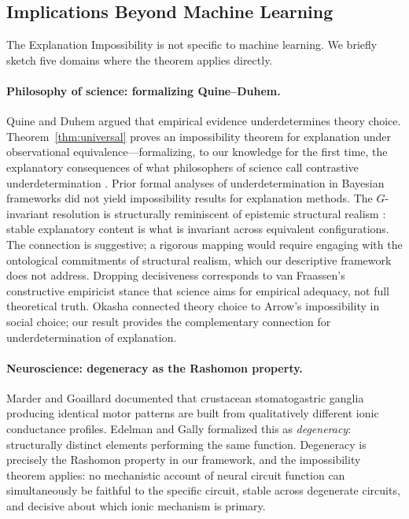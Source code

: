 \documentclass{article}
\begin{document}
\subsection{Implications Beyond Machine Learning}
\label{sec:beyond-ml}

The Explanation Impossibility is not specific to machine learning.
We briefly sketch five domains where the theorem applies directly.

\paragraph{Philosophy of science: formalizing Quine--Duhem.}
Quine \citep{quine1951dogmas} and Duhem \citep{duhem1906aim} argued that
empirical evidence underdetermines theory choice.  Theorem~\ref{thm:universal}
proves an impossibility theorem for explanation under observational
equivalence---formalizing, to our knowledge for the first time, the explanatory
consequences of what philosophers of science call contrastive
underdetermination \citep{laudan1991empirical}. Prior formal analyses of
underdetermination in Bayesian
frameworks \citep{dorling1979bayesian,howson2006scientific} did not yield
impossibility results for explanation methods. The $G$-invariant
resolution is structurally reminiscent of epistemic structural
realism \citep{worrall1989structural}: stable explanatory content is what
is invariant across equivalent configurations. The connection is suggestive;
a rigorous mapping would require engaging with the ontological commitments
of structural realism, which our descriptive framework does not address.
Dropping decisiveness corresponds to van
Fraassen's \citep{vanfraassen1980scientific} constructive empiricist stance
that science aims for empirical adequacy, not full theoretical truth.
Okasha \citep{okasha2011theory} connected theory choice to Arrow's impossibility
in social choice; our result provides the complementary connection for
underdetermination of explanation.

\paragraph{Neuroscience: degeneracy as the Rashomon property.}
Marder and Goaillard \citep{marder2006variability} documented that crustacean
stomatogastric ganglia producing identical motor patterns are built from
qualitatively different ionic conductance profiles.  Edelman and Gally
\citep{edelman2001degeneracy} formalized this as \emph{degeneracy}:
structurally distinct elements performing the same function.  Degeneracy is
precisely the Rashomon property in our framework, and the impossibility
theorem applies: no mechanistic account of neural circuit function can
simultaneously be faithful to the specific circuit, stable across degenerate
circuits, and decisive about which ionic mechanism is primary.
\end{document}
